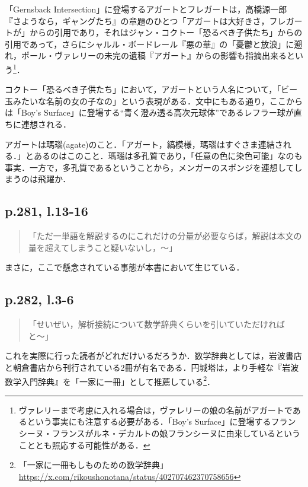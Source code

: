 \documentclass[10pt, a5paper, twoside]{ltjsarticle}
\begin{document}
            「Gernsback Intersection」に登場するアガートとフレガートは，高橋源一郎『さようなら，ギャングたち』の章題のひとつ「アガートは大好きさ，フレガートが」からの引用であり，それはジャン・コクトー「恐るべき子供たち」からの引用であって，さらにシャルル・ボードレール『悪の華』の「憂鬱と放浪」に遡れ，ポール・ヴァレリーの未完の遺稿『アガート』からの影響も指摘出来るという\footnote{ヴァレリーまで考慮に入れる場合は，ヴァレリーの娘の名前がアガートであるという事実にも注意する必要がある．「Boy's Surface」に登場するフランシーヌ・フランスがルネ・デカルトの娘フランシーヌに由来しているということとも照応する可能性がある．}．

            コクトー「恐るべき子供たち」において，アガートという人名について，「ビー玉みたいな名前の女の子なの」という表現がある．文中にもある通り，ここからは「Boy's Surface」に登場する“青く澄み透る高次元球体”であるレフラー球が直ちに連想される．

            アガートは瑪瑙(agate)のこと．「アガート，縞模様，瑪瑙はすぐさま連結される．」とあるのはこのこと．瑪瑙は多孔質であり，「任意の色に染色可能」なのも事実．一方で，多孔質であるということから，メンガーのスポンジを連想してしまうのは飛躍か．

        \subsection{p.281, l.13-16}

            \begin{quote}
                「ただ一単語を解説するのにこれだけの分量が必要ならば，解説は本文の量を超えてしまうこと疑いないし，〜」
            \end{quote}

            まさに，ここで懸念されている事態が本書において生じている．

        \subsection{p.282, l.3-6}

            \begin{quote}
                「せいぜい，解析接続について数学辞典くらいを引いていただければと〜」
            \end{quote}

            これを実際に行った読者がどれだけいるだろうか．数学辞典としては，岩波書店\cite{iwanami}と朝倉書店\cite{asakura}から刊行されている2冊が有名である．円城塔は，より手軽な『岩波数学入門辞典』\cite{iwanamiint}を「一家に一冊」として推薦している\footnote{「一家に一冊もしものための数学辞典」\url{https://x.com/rikoushonotana/status/402707462370758656}}．
\end{document}
